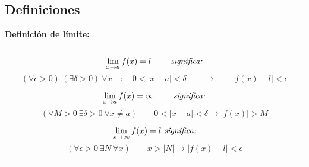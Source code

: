 \documentclass[12pt,a4paper]{extarticle}
\begin{document}
\subsection{Definiciones}
\begin{minipage}{16cm}
\textbf{Definici\'on de l\'imite:}
\vspace{1em}
\hrule
\vspace{1em}
\[\lim_{x \to a}f(x) = l \qquad \emph{ significa:}\]
\[
(\forall \epsilon > 0) \ (\exists \delta > 0) \ \forall x \quad : \quad 0<|x-a|<
\delta
\qquad  \to \qquad  |f(x) - l| < \epsilon   
\]

\vspace{0.5em}
\[ \lim_{x \to a}f(x) = \infty \qquad \emph{ significa:}\]
\[ (\forall M > 0 \ \exists \delta > 0 \ \forall x \neq a) \qquad   0<|x-a| < \delta  \to  |f(x)| >
M   
 \]
\vspace{0.5em}

\[ \lim_{x \to \infty}f(x) = l \emph{ significa:} \]
\[ (\forall \epsilon > 0 \ \exists N \ \forall x) \qquad  x > |N|  \to
 |f(x) - l| < \epsilon  
 \]
\hrule
\vspace{1em}
\end{minipage}
\end{document}
